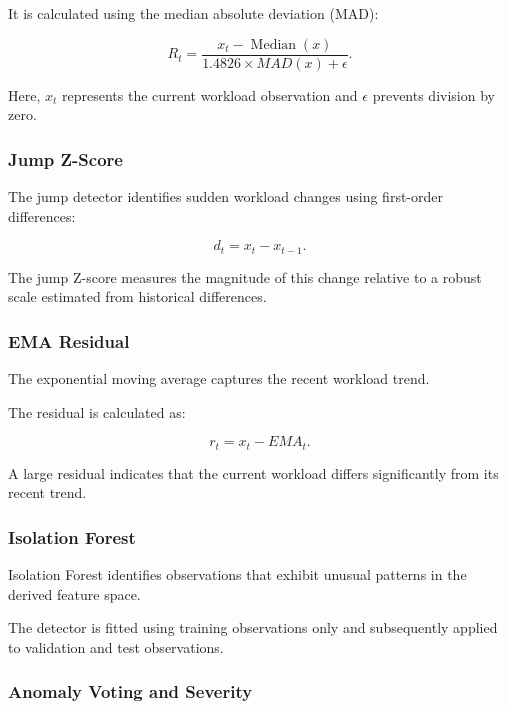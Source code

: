 \documentclass[conference]{IEEEtran}
\begin{document}
It is calculated using the median absolute deviation (MAD):

\begin{equation}
R_t =
\frac{x_t-\operatorname{Median}(x)}
{1.4826 \times MAD(x)+\epsilon}.
\end{equation}

Here, $x_t$ represents the current workload observation and $\epsilon$ prevents division by zero.

\subsubsection{Jump Z-Score}

The jump detector identifies sudden workload changes using first-order differences:

\begin{equation}
d_t=x_t-x_{t-1}.
\end{equation}

The jump Z-score measures the magnitude of this change relative to a robust scale estimated from historical differences.

\subsubsection{EMA Residual}

The exponential moving average captures the recent workload trend.

The residual is calculated as:

\begin{equation}
r_t=x_t-EMA_t.
\end{equation}

A large residual indicates that the current workload differs significantly from its recent trend.

\subsubsection{Isolation Forest}

Isolation Forest identifies observations that exhibit unusual patterns in the derived feature space.

The detector is fitted using training observations only and subsequently applied to validation and test observations.

\subsubsection{Anomaly Voting and Severity}
\end{document}
